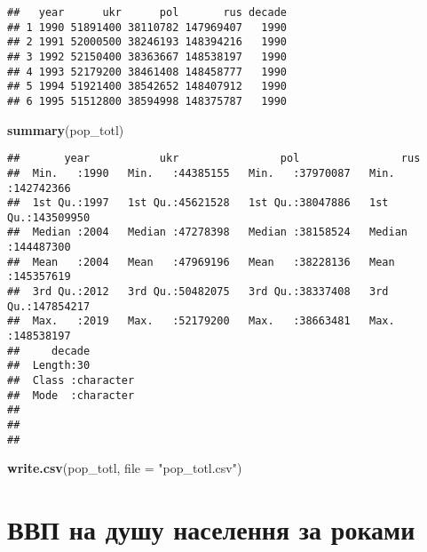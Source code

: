 \documentclass[
]{article}
\newenvironment{Shaded}{\begin{snugshade}}{\end{snugshade}}
\newcommand{\DataTypeTok}[1]{\textcolor[rgb]{0.13,0.29,0.53}{#1}}
\newcommand{\KeywordTok}[1]{\textcolor[rgb]{0.13,0.29,0.53}{\textbf{#1}}}
\newcommand{\NormalTok}[1]{#1}
\newcommand{\StringTok}[1]{\textcolor[rgb]{0.31,0.60,0.02}{#1}}
\begin{document}
\begin{verbatim}
##   year      ukr      pol       rus decade
## 1 1990 51891400 38110782 147969407   1990
## 2 1991 52000500 38246193 148394216   1990
## 3 1992 52150400 38363667 148538197   1990
## 4 1993 52179200 38461408 148458777   1990
## 5 1994 51921400 38542652 148407912   1990
## 6 1995 51512800 38594998 148375787   1990
\end{verbatim}

\begin{Shaded}
\begin{Highlighting}[]
\KeywordTok{summary}\NormalTok{(pop_totl)}
\end{Highlighting}
\end{Shaded}

\begin{verbatim}
##       year           ukr                pol                rus           
##  Min.   :1990   Min.   :44385155   Min.   :37970087   Min.   :142742366  
##  1st Qu.:1997   1st Qu.:45621528   1st Qu.:38047886   1st Qu.:143509950  
##  Median :2004   Median :47278398   Median :38158524   Median :144487300  
##  Mean   :2004   Mean   :47969196   Mean   :38228136   Mean   :145357619  
##  3rd Qu.:2012   3rd Qu.:50482075   3rd Qu.:38337408   3rd Qu.:147854217  
##  Max.   :2019   Max.   :52179200   Max.   :38663481   Max.   :148538197  
##     decade         
##  Length:30         
##  Class :character  
##  Mode  :character  
##                    
##                    
## 
\end{verbatim}

\begin{Shaded}
\begin{Highlighting}[]
\KeywordTok{write.csv}\NormalTok{(pop_totl, }\DataTypeTok{file =} \StringTok{"pop_totl.csv"}\NormalTok{)}
\end{Highlighting}
\end{Shaded}

\hypertarget{ux432ux432ux43f-ux43dux430-ux434ux443ux448ux443-ux43dux430ux441ux435ux43bux435ux43dux43dux44f-ux437ux430-ux440ux43eux43aux430ux43cux438}{%
\section{ВВП на душу населення за
роками}\label{ux432ux432ux43f-ux43dux430-ux434ux443ux448ux443-ux43dux430ux441ux435ux43bux435ux43dux43dux44f-ux437ux430-ux440ux43eux43aux430ux43cux438}}
\end{document}
